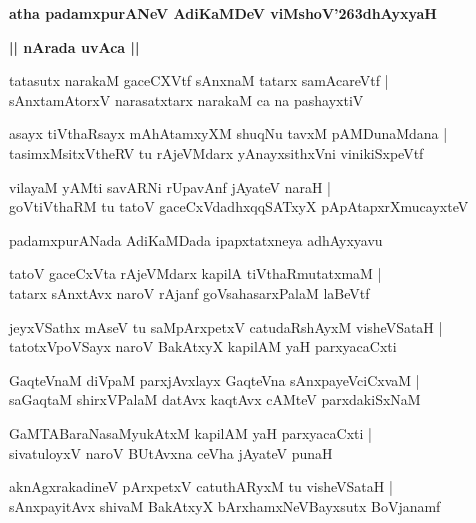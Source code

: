 \documentclass[twoside,12pt,openright]{book}
\def\S{\char'263}
\newcounter{shloka}[chapter]
\def\uvaca#1{\centerline{{\large\textbf{#1}}}}
\begin{document}
\begin{center}
{\LARGE\bfseries atha padamxpurANeV AdiKaMDeV viMshoV\S dhAyxyaH}
\end{center}

\uvaca{|| nArada uvAca ||}


\begin{shloka}
tatasutx narakaM gaceCXVtf sAnxnaM tatarx samAcareVtf |\\
sAnxtamAtorxV narasatxtarx narakaM ca na pashayxtiV 
\end{shloka}

\begin{shloka}
asayx tiVthaRsayx mAhAtamxyXM shuqNu tavxM pAMDunaMdana |\\
tasimxMsitxVtheRV tu rAjeVMdarx yAnayxsithxVni vinikiSxpeVtf 
\end{shloka}

\begin{shloka}
vilayaM yAMti savARNi rUpavAnf jAyateV naraH |\\
goVtiVthaRM tu tatoV gaceCxVdadhxqqSATxyX pApAtapxrXmucayxteV 
\end{shloka}

\begin{center}
padamxpurANada AdiKaMDada ipapxtatxneya adhAyxyavu
\end{center}


\begin{shloka}
tatoV gaceCxVta rAjeVMdarx kapilA tiVthaRmutatxmaM |\\
tatarx sAnxtAvx naroV rAjanf goVsahasarxPalaM laBeVtf 
\end{shloka}

\begin{shloka}
jeyxVSathx mAseV tu saMpArxpetxV catudaRshAyxM visheVSataH |\\
tatotxVpoVSayx naroV BakAtxyX kapilAM yaH parxyacaCxti
\end{shloka}

\begin{shloka}
GaqteVnaM diVpaM parxjAvxlayx GaqteVna sAnxpayeVciCxvaM |\\
saGaqtaM shirxVPalaM datAvx kaqtAvx cAMteV parxdakiSxNaM 
\end{shloka}

\begin{shloka}
GaMTABaraNasaMyukAtxM kapilAM yaH parxyacaCxti |\\
sivatuloyxV naroV BUtAvxna ceVha jAyateV punaH 
\end{shloka}

\begin{shloka}
aknAgxrakadineV pArxpetxV catuthARyxM tu visheVSataH |\\
sAnxpayitAvx shivaM BakAtxyX bArxhamxNeVBayxsutx BoVjanamf
\end{shloka}
\end{document}
